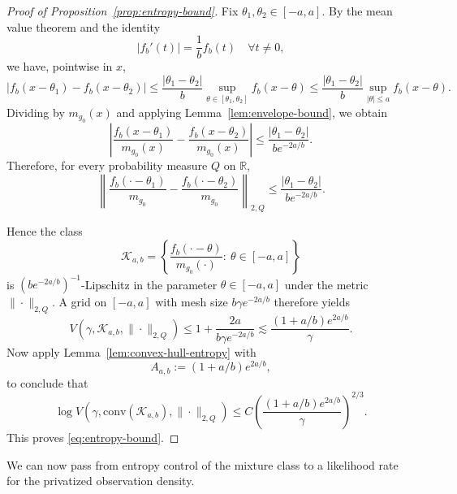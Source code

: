 \documentclass[english, 11pt]{article}
\theoremstyle{plain}
\theoremstyle{definition}
\theoremstyle{remark}
\begin{document}
\begin{appendix}
\begin{proof}[Proof of Proposition~\ref{prop:entropy-bound}]
Fix $\theta_1,\theta_2\in[-a,a]$. By the mean value theorem and the identity
\begin{equation*}
|f_b'(t)|=\frac{1}{b}f_b(t) \quad \forall t\neq 0,
\end{equation*}
we have, pointwise in $x$,
\begin{equation*}
|f_b(x-\theta_1)-f_b(x-\theta_2)|
\le \frac{|\theta_1-\theta_2|}{b} \sup_{\theta\in[\theta_1,\theta_2]} f_b(x-\theta) \le \frac{|\theta_1-\theta_2|}{b}\sup_{|\theta|\le a} f_b(x-\theta).
\end{equation*}
Dividing by $m_{g_0}(x)$ and applying Lemma~\ref{lem:envelope-bound}, we obtain
\begin{equation*}
\left| \frac{f_b(x-\theta_1)}{m_{g_0}(x)}-\frac{f_b(x-\theta_2)}{m_{g_0}(x)} \right| \le \frac{|\theta_1-\theta_2|}{be^{-2a/b}}.
\end{equation*}
Therefore, for every probability measure $Q$ on $\mathbb R$,
\begin{equation*}
\left\| \frac{f_b(\cdot-\theta_1)}{m_{g_0}} - \frac{f_b(\cdot-\theta_2)}{m_{g_0}} \right\|_{2,Q} \le \frac{|\theta_1-\theta_2|}{be^{-2a/b}}.
\end{equation*}

Hence the class
\begin{equation*}
\mathcal K_{a,b} = \left\{ \frac{f_b(\cdot-\theta)}{m_{g_0}(\cdot)}:\ \theta\in[-a,a] \right\}
\end{equation*}
is $(be^{-2a/b})^{-1}$-Lipschitz in the parameter $\theta\in[-a,a]$ under the metric $\|\cdot\|_{2,Q}$. 
A grid on $[-a,a]$ with mesh size $b\gamma e^{-2a/b}$ therefore yields
\begin{equation*}
V\left(\gamma,\mathcal K_{a,b},\|\cdot\|_{2,Q}\right) \le 1+\frac{2a}{b\gamma e^{-2a/b}} \lesssim
\frac{(1+a/b) e^{2a/b}}{\gamma}.
\end{equation*}
Now apply Lemma~\ref{lem:convex-hull-entropy} with
\begin{equation*}
A_{a,b} := (1+a/b) e^{2a/b},
\end{equation*}
to conclude that
\begin{equation*}
\log V \left( \gamma, \mathrm{conv}(\mathcal K_{a,b}), \|\cdot\|_{2,Q} \right) \le C\left(\frac{(1+a/b) e^{2a/b}}{\gamma}\right)^{2/3}.
\end{equation*}
This proves \eqref{eq:entropy-bound}.
\end{proof}

We can now pass from entropy control of the mixture class to a likelihood rate for the privatized observation density. 


\end{appendix}
\end{document}
